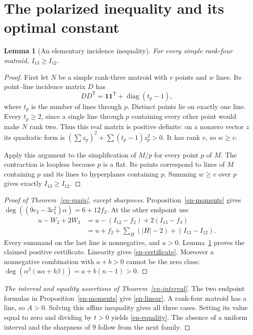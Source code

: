 \documentclass[12pt]{amsart}
\newtheorem{lem}[thm]{Lemma}
\theoremstyle{definition}
\theoremstyle{remark}
\numberwithin{equation}{section}
\begin{document}
\section{The polarized inequality and its optimal constant}
\begin{lem}[An elementary incidence inequality]\label{en-incidence}
For every simple rank-four matroid, $I_{13}\geq I_{12}$.
\end{lem}
\begin{proof}
First let $N$ be a simple rank-three matroid with $v$ points and $w$ lines. Its point--line incidence matrix $D$ has
\[
 DD^{\mathsf T}=\mathbf 1\mathbf 1^{\mathsf T}
                         +\operatorname{diag}(t_p-1),
\]
where $t_p$ is the number of lines through $p$. Distinct points lie on exactly one line. Every $t_p\geq2$, since a single line through $p$ containing every other point would make $N$ rank two. Thus this real matrix is positive definite: on a nonzero vector $z$ its quadratic form is $(\sum z_p)^2+\sum(t_p-1)z_p^2>0$. It has rank $v$, so $w\geq v$.

Apply this argument to the simplification of $M/p$ for every point $p$ of $M$. The contraction is loopless because $p$ is a flat. Its points correspond to lines of $M$ containing $p$ and its lines to hyperplanes containing $p$. Summing $w\geq v$ over $p$ gives exactly $I_{13}\geq I_{12}$.
\end{proof}

\begin{proof}[Proof of Theorem~\ref{en-main}, except sharpness]
Proposition~\ref{en-moments} gives $\deg((9c_2-3c_1^2)\alpha)=6+12f_2$. At the other endpoint use
\begin{align*}
 u-W_2+2W_3
 &=u-(I_{12}-f_2)+2(I_{13}-f_3)\\
 &=u+f_2+\sum_H(|H|-2)+(I_{13}-I_{12}).
\end{align*}
Every summand on the last line is nonnegative, and $u>0$. Lemma~\ref{en-incidence} proves the claimed positive certificate. Linearity gives \eqref{en-certificate}. Moreover a nonnegative combination with $a+b>0$ cannot be the zero class: $\deg(\alpha^2(a\alpha+b\beta))=a+b(n-1)>0$.
\end{proof}

\begin{proof}[The interval and equality assertions of Theorem~\ref{en-interval}]
The two endpoint formulas in Proposition~\ref{en-moments} give \eqref{en-linear}. A rank-four matroid has a line, so $A>0$. Solving this affine inequality gives all three cases. Setting its value equal to zero and dividing by $t>0$ yields \eqref{en-equality}. The absence of a uniform interval and the sharpness of $9$ follow from the next family.
\end{proof}
\end{document}
